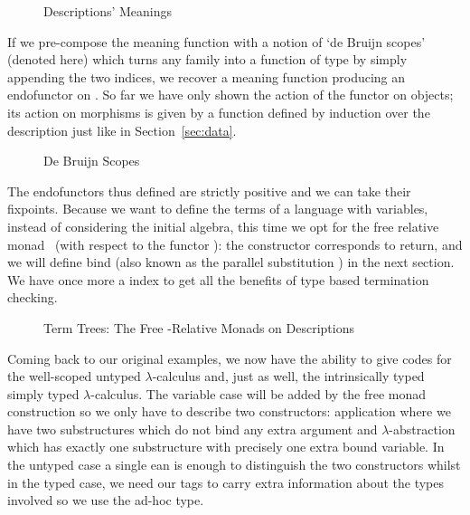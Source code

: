 \begin{figure}[h]
\caption{Descriptions' Meanings}
\end{figure}

If we pre-compose the meaning function  with a notion of `de Bruijn scopes'
(denoted  here) which turns any   family into a function
of type      by simply appending the two
 indices, we recover a meaning function producing an endofunctor on
 . So far we have only shown the action of the functor on objects;
its action on morphisms is given by a function  defined by induction over
the description just like in Section~\ref{sec:data}.

\begin{figure}[h]
\caption{De Bruijn Scopes}
\end{figure}

The endofunctors thus defined are strictly positive and we can take their fixpoints.
Because we want to define the terms of a language with variables, instead of
considering the initial algebra, this time we opt for the free relative
monad~\cite{JFR4389} (with respect to the functor ): the 
constructor corresponds to return, and we will define bind (also known as
the parallel substitution ) in the next section. We have once more
a  index to get all the benefits of type based termination checking.

\begin{figure}[h]
\caption{Term Trees: The Free -Relative Monads on Descriptions}
\end{figure}

Coming back to our original examples, we now have the ability to give
codes for the well-scoped untyped $\lambda$-calculus and, just as well,
the intrinsically typed simply typed $\lambda$-calculus.
The variable case will be added by the free monad construction so we
only have to describe two constructors: application where we have two
substructures which do not bind any extra argument and $\lambda$-abstraction
which has exactly one substructure with precisely one extra bound variable.
In the untyped case a single ean is enough to distinguish the two constructors
whilst in the typed case, we need our tags to carry extra information about the
types involved so we use the ad-hoc  type.

